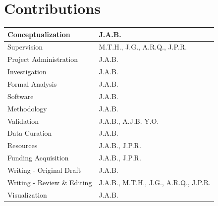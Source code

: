 \documentclass[11pt, a4paper, oneside]{article}
\begin{document}
\section*{Contributions}
\begin{tabular}{ l l }
 Conceptualization & J.A.B. \\
 \hline
 Supervision & M.T.H., J.G., A.R.Q., J.P.R. \\
 \hline
 Project Administration & J.A.B. \\
 \hline
 Investigation & J.A.B. \\
 \hline
 Formal Analysis & J.A.B. \\
 \hline
 Software & J.A.B. \\
 \hline
 Methodology & J.A.B. \\
 \hline
 Validation & J.A.B., A.J.B. Y.O. \\
 \hline
 Data Curation & J.A.B. \\
 \hline
 Resources & J.A.B., J.P.R. \\
 \hline
 Funding Acquisition & J.A.B., J.P.R. \\
 \hline
 Writing - Original Draft & J.A.B. \\
 \hline
 Writing - Review \& Editing & J.A.B., M.T.H., J.G., A.R.Q., J.P.R. \\
 \hline
 Visualization & J.A.B.
\end{tabular}
\end{document}
